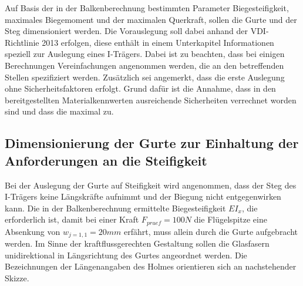 
Auf Basis der in der Balkenberechnung bestimmten Parameter Biegesteifigkeit, maximales Biegemoment und der maximalen Querkraft, sollen die Gurte und der Steg dimensioniert werden. Die Vorauslegung soll dabei anhand der VDI- Richtlinie 2013 erfolgen, diese enthält in einem Unterkapitel Informationen speziell zur Auslegung eines I-Trägers. Dabei ist zu beachten, dass bei einigen Berechnungen Vereinfachungen angenommen werden, die an den betreffenden Stellen spezifiziert werden. Zusätzlich sei angemerkt, dass die erste Auslegung ohne Sicherheitsfaktoren erfolgt. Grund dafür ist die Annahme, dass in den bereitgestellten Materialkennwerten ausreichende Sicherheiten verrechnet worden sind und dass die maximal zu.

\subsection{Dimensionierung der Gurte zur Einhaltung der Anforderungen an die Steifigkeit}
Bei der Auslegung der Gurte auf Steifigkeit wird angenommen, dass der Steg des I-Trägers keine Längskräfte aufnimmt und der Biegung nicht entgegenwirken kann. Die in der Balkenberechnung ermittelte Biegesteifigkeit $ EI_{x} $, die erforderlich ist, damit bei einer Kraft $ F_{pruef}=100N $ die Flügelspitze eine Absenkung von $ w_{j=1,1}=20mm $ erfährt, muss allein durch die Gurte aufgebracht werden. Im Sinne der kraftflussgerechten Gestaltung sollen die Glasfasern unidirektional in Längsrichtung des Gurtes angeordnet werden. Die Bezeichnungen der Längenangaben des Holmes orientieren sich an nachstehender Skizze.

